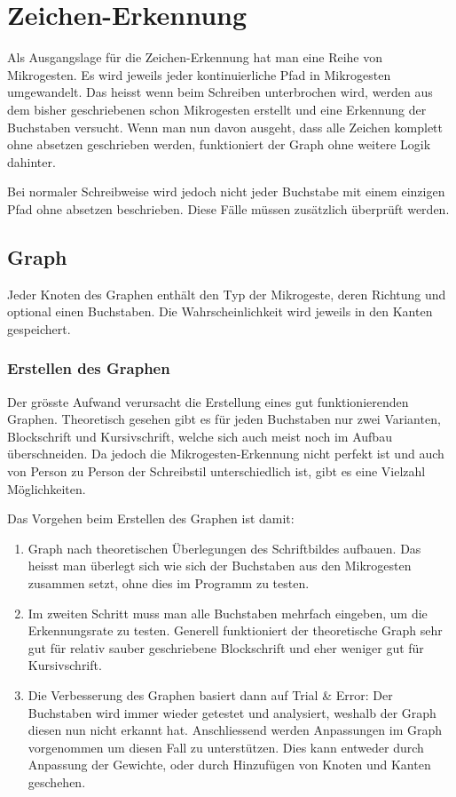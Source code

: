 \chapter{Zeichen-Erkennung}
Als Ausgangslage für die Zeichen-Erkennung hat man eine Reihe von Mikrogesten. Es wird jeweils jeder kontinuierliche Pfad in Mikrogesten umgewandelt. Das heisst wenn beim Schreiben unterbrochen wird, werden aus dem bisher geschriebenen schon Mikrogesten erstellt und eine Erkennung der Buchstaben versucht. Wenn man nun davon ausgeht, dass alle Zeichen komplett ohne absetzen geschrieben werden, funktioniert der Graph ohne weitere Logik dahinter. 

Bei normaler Schreibweise wird jedoch nicht jeder Buchstabe mit einem einzigen Pfad ohne absetzen beschrieben. Diese Fälle müssen zusätzlich überprüft werden.

\section{Graph}
Jeder Knoten des Graphen enthält den Typ der Mikrogeste, deren Richtung und optional einen Buchstaben. Die Wahrscheinlichkeit wird jeweils in den Kanten gespeichert. 

\subsection{Erstellen des Graphen}
Der grösste Aufwand verursacht die Erstellung eines gut funktionierenden Graphen. Theoretisch gesehen gibt es für jeden Buchstaben nur zwei Varianten, Blockschrift und Kursivschrift, welche sich auch meist noch im Aufbau überschneiden. Da jedoch die Mikrogesten-Erkennung nicht perfekt ist und auch von Person zu Person der Schreibstil unterschiedlich ist, gibt es eine Vielzahl Möglichkeiten. 

Das Vorgehen beim Erstellen des Graphen ist damit:
\begin{enumerate}
\item Graph nach theoretischen Überlegungen des Schriftbildes aufbauen. Das heisst man überlegt sich wie sich der Buchstaben aus den Mikrogesten zusammen setzt, ohne dies im Programm zu testen.
\item Im zweiten Schritt muss man alle Buchstaben mehrfach eingeben, um die Erkennungsrate zu testen. Generell funktioniert der theoretische Graph sehr gut für relativ sauber geschriebene Blockschrift und eher weniger gut für Kursivschrift.
\item Die Verbesserung des Graphen basiert dann auf Trial \& Error: Der Buchstaben wird immer wieder getestet und analysiert, weshalb der Graph diesen nun nicht erkannt hat. Anschliessend werden Anpassungen im Graph vorgenommen um diesen Fall zu unterstützen. Dies kann entweder durch Anpassung der Gewichte, oder durch Hinzufügen von Knoten und Kanten geschehen.
\end{enumerate}

